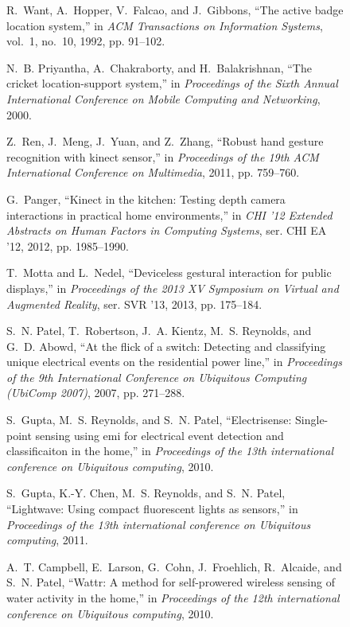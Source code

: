 \documentclass[journal]{IEEEtran}
\begin{document}
\begin{figure*}
\begin{thebibliography}{100}
R.~Want, A.~Hopper, V.~Falcao, and J.~Gibbons, ``The active badge location
  system,'' in \emph{ACM Transactions on Information Systems}, vol.~1, no.~10,
  1992, pp. 91--102.

N.~B. Priyantha, A.~Chakraborty, and H.~Balakrishnan, ``The cricket
  location-support system,'' in \emph{Proceedings of the Sixth Annual
  International Conference on Mobile Computing and Networking}, 2000.

Z.~Ren, J.~Meng, J.~Yuan, and Z.~Zhang, ``Robust hand gesture recognition with
  kinect sensor,'' in \emph{Proceedings of the 19th ACM International
  Conference on Multimedia}, 2011, pp. 759--760.

G.~Panger, ``Kinect in the kitchen: Testing depth camera interactions in
  practical home environments,'' in \emph{CHI '12 Extended Abstracts on Human
  Factors in Computing Systems}, ser. CHI EA '12, 2012, pp. 1985--1990.

T.~Motta and L.~Nedel, ``Deviceless gestural interaction for public displays,''
  in \emph{Proceedings of the 2013 XV Symposium on Virtual and Augmented
  Reality}, ser. SVR '13, 2013, pp. 175--184.

S.~N. Patel, T.~Robertson, J.~A. Kientz, M.~S. Reynolds, and G.~D. Abowd, ``At
  the flick of a switch: Detecting and classifying unique electrical events on
  the residential power line,'' in \emph{Proceedings of the 9th International
  Conference on Ubiquitous Computing (UbiComp 2007)}, 2007, pp. 271--288.

S.~Gupta, M.~S. Reynolds, and S.~N. Patel, ``Electrisense: Single-point sensing
  using emi for electrical event detection and classificaiton in the home,'' in
  \emph{Proceedings of the 13th international conference on Ubiquitous
  computing}, 2010.

S.~Gupta, K.-Y. Chen, M.~S. Reynolds, and S.~N. Patel, ``Lightwave: Using
  compact fluorescent lights as sensors,'' in \emph{Proceedings of the 13th
  international conference on Ubiquitous computing}, 2011.

A.~T. Campbell, E.~Larson, G.~Cohn, J.~Froehlich, R.~Alcaide, and S.~N. Patel,
  ``Wattr: A method for self-prowered wireless sensing of water activity in the
  home,'' in \emph{Proceedings of the 12th international conference on
  Ubiquitous computing}, 2010.


\end{thebibliography}
\end{figure*}
\end{document}
